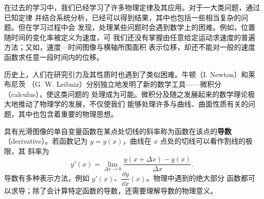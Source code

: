 {\newcommand{\soldiagOneSixteen}{%
\begin{center}
\begin{tikzpicture}[scale=0.9,>=Latex]
  \coordinate (A) at (0,-2.2); \coordinate (O) at (0,0);
  \coordinate (X) at (2.6,0); \coordinate (DX) at (3.35,0);
  \draw[thick,->] (-0.5,0)--(4.2,0);
  \draw[guide] (A)--(O);
  \draw[thick] (A)--(X); \draw[thick] (A)--(DX);
  \fill (A) circle (2.5pt) node[below left] {$A$};
  \node[above] at (O) {$O$};
  \node[above left=1pt] at (X) {$x$};
  \node[above right=1pt] at (DX) {$x+\Delta x$};
  \draw[<->] (-0.35,0)--node[left] {$h$}(-0.35,-2.2);
  \draw pic[draw,->,"$\theta$",angle radius=8mm,angle eccentricity=1.3]
    {angle=X--A--O};
  \draw pic[draw,->,DeepBlue,angle radius=17mm]
    {angle=DX--A--X};
  \node[DeepBlue] (DeltaLabel) at (3.25,-1.75) {$\Delta\theta$};
  \draw[guide] (DeltaLabel.west)--(1.36,-1.18);
  \draw[component] (2.6,.85)--(3.35,.85) node[midway,above] {$\Delta x$};
  \draw[guide] (X)--(2.6,.95) (DX)--(3.35,.95);
  \node[align=left,TextGray] at (6.05,-.75)
    {$\displaystyle \tan\theta=\frac{x}{h}$\\[3pt]
     $\displaystyle \Delta\theta\simeq
       \frac{h\,\Delta x}{h^2+x^2}$};
\end{tikzpicture}
\end{center}}


在过去的学习中，我们已经学习了许多物理定律及其应用。对于一大类问题，通过已知定律
并结合系统分析，已经可以得到结果，其中也包括一些相当复杂的问题。但在学习过程中会
发现，处理某些问题时会遇到数学上的困难。例如，位置随时间的变化率被定义为速度，可
我们还没有掌握由任意给定运动求速度的普遍方法；又如，速度—时间图像与横轴所围面积
表示位移，却还不能对一般的速度函数求任意一段时间内的位移。

历史上，人们在研究引力及其性质时也遇到了类似困难。牛顿（I. Newton）和莱布尼茨
（G. W. Leibniz）分别独立地发明了新的数学工具——微积分（calculus），使这类问题的
处理成为可能。微积分及随之发展起来的数学理论极大地推动了物理学的发展，不仅使我们
能够处理许多与曲线、曲面性质有关的问题，其中也包含着重要的物理思想。

具有光滑图像的单自变量函数在某点处切线的斜率称为函数在该点的\textbf{导数}
（derivative）。若函数记为 $y=y(x)$，曲线在 $x$ 点处的切线可以看作割线的极限，其
斜率为
\begin{equation}
 y'(x)=\lim_{\Delta x\to0}\frac{y(x+\Delta x)-y(x)}{\Delta x}.
\end{equation}
导数有多种表示方法，例如 $y'(x)$、$\dfrac{\dd y}{\dd x}(x)$。物理中遇到的绝大部分
函数都可以求导；除了会计算特定函数的导数，还需要理解导数的物理意义。

}
